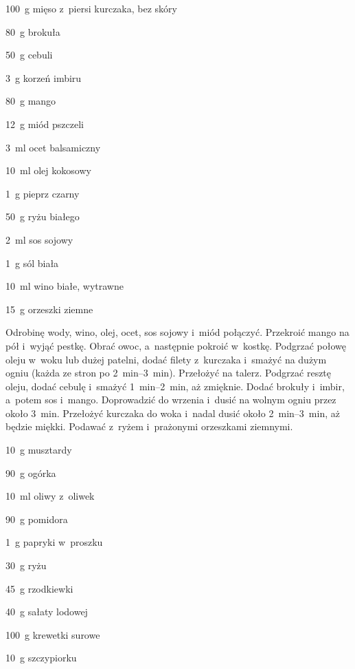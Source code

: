 \documentclass[../kucharek.tex]{subfiles}
\begin{document}
\begin{Ingred}
    \item \qty{100}{\gram} mięso z~piersi kurczaka, bez skóry
    \item \qty{80}{\gram} brokuła
    \item \qty{50}{\gram} cebuli
    \item \qty{3}{\gram} korzeń imbiru
    \item \qty{80}{\gram} mango
    \item \qty{12}{\gram} miód pszczeli
    \item \qty{3}{\milli\litre} ocet balsamiczny
    \item \qty{10}{\milli\litre} olej kokosowy
    \item \qty{1}{\gram} pieprz czarny
    \item \qty{50}{\gram} ryżu białego
    \item \qty{2}{\milli\litre} sos sojowy
    \item \qty{1}{\gram} sól biała
    \item \qty{10}{\milli\litre} wino białe, wytrawne
    \item \qty{15}{\gram} orzeszki ziemne
\end{Ingred}

Odrobinę wody, wino, olej, ocet, sos sojowy i~miód połączyć. Przekroić mango na
pół i~wyjąć pestkę. Obrać owoc, a~następnie pokroić w~kostkę. Podgrzać połowę
oleju w~woku lub dużej patelni, dodać filety z~kurczaka i~smażyć na dużym ogniu
(każda ze stron po \qtyrange{2}{3}{\minute}). Przełożyć na talerz. Podgrzać
resztę oleju, dodać cebulę i~smażyć \qtyrange{1}{2}{\minute}, aż zmięknie.
Dodać brokuły i~imbir, a~potem sos i~mango. Doprowadzić do wrzenia i~dusić na
wolnym ogniu przez około \qty{3}{\minute}. Przełożyć kurczaka do woka i~nadal
dusić około \qtyrange{2}{3}{\minute}, aż będzie miękki. Podawać z~ryżem
i~prażonymi orzeszkami ziemnymi.


\begin{Ingred}
    \item \qty{10}{\gram} musztardy
    \item \qty{90}{\gram} ogórka
    \item \qty{10}{\milli\litre} oliwy z~oliwek
    \item \qty{90}{\gram} pomidora
    \item \qty{1}{\gram} papryki w~proszku
    \item \qty{30}{\gram} ryżu
    \item \qty{45}{\gram} rzodkiewki
    \item \qty{40}{\gram} sałaty lodowej
    \item \qty{100}{\gram} krewetki surowe
    \item \qty{10}{\gram} szczypiorku
\end{Ingred}
\end{document}

